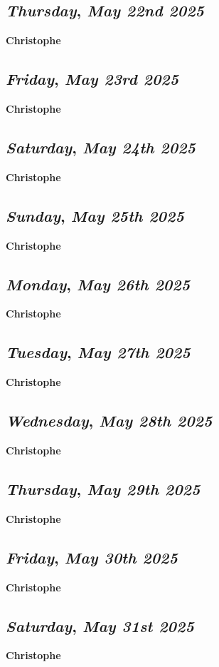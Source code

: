 \def\day{\textit{May 22nd 2025}}
\def\weekday{\textit{Thursday}}
\subsection*{\weekday, \day}
\textbf {Christophe}

\def\day{\textit{May 23rd 2025}}
\def\weekday{\textit{Friday}}
\subsection*{\weekday, \day}
\textbf {Christophe}

\def\day{\textit{May 24th 2025}}
\def\weekday{\textit{Saturday}}
\subsection*{\weekday, \day}
\textbf {Christophe}

\def\day{\textit{May 25th 2025}}
\def\weekday{\textit{Sunday}}
\subsection*{\weekday, \day}
\textbf {Christophe}

\def\day{\textit{May 26th 2025}}
\def\weekday{\textit{Monday}}
\subsection*{\weekday, \day}
\textbf {Christophe}

\def\day{\textit{May 27th 2025}}
\def\weekday{\textit{Tuesday}}
\subsection*{\weekday, \day}
\textbf {Christophe}

\def\day{\textit{May 28th 2025}}
\def\weekday{\textit{Wednesday}}
\subsection*{\weekday, \day}
\textbf {Christophe}

\def\day{\textit{May 29th 2025}}
\def\weekday{\textit{Thursday}}
\subsection*{\weekday, \day}
\textbf {Christophe}

\def\day{\textit{May 30th 2025}}
\def\weekday{\textit{Friday}}
\subsection*{\weekday, \day}
\textbf {Christophe}

\def\day{\textit{May 31st 2025}}
\def\weekday{\textit{Saturday}}
\subsection*{\weekday, \day}
\textbf {Christophe}
